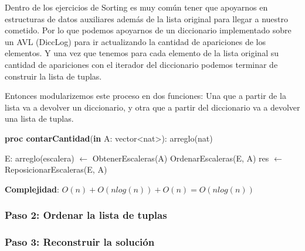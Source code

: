 \documentclass{article}
\newcommand{\Complexity}[1]{\textbf{Complejidad}: #1}
\begin{document}
Dentro de los ejercicios de Sorting es muy común tener que apoyarnos en estructuras de datos auxiliares además de la lista original para llegar a nuestro cometido. Por lo que podemos apoyarnos de un diccionario implementado sobre un AVL (DiccLog) para ir actualizando la cantidad de apariciones de los elementos. Y una vez que tenemos para cada elemento de la lista original su cantidad de apariciones con el iterador del diccionario podemos terminar de construir la lista de tuplas.

Entonces modularizemos este proceso en dos funciones: Una que a partir de la lista va a devolver un diccionario, y otra que a partir del diccionario va a devolver una lista de tuplas. 
\begin{algorithm}[H]
    \caption{
        \textbf{proc contarCantidad}(\textbf{in} A: vector<nat>): arreglo(nat)
    }
    \begin{algorithmic}[1]
        \State E: arreglo(escalera) $\gets$ ObtenerEscaleras(A) 
        \State OrdenarEscaleras(E, A) 
        \State res $\gets$ ReposicionarEscaleras(E, A) 
    \end{algorithmic}
    \Complexity{$O(n) + O(n log(n)) + O(n) = O(n log(n))$}
    \end{algorithm}
\subsubsection*{Paso 2: Ordenar la lista de tuplas}
\subsubsection*{Paso 3: Reconstruir la solución}
\end{document}
